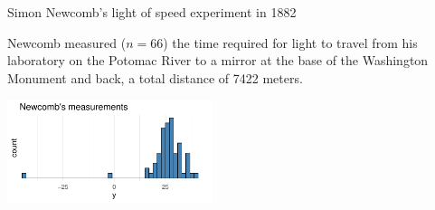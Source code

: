 \documentclass[10pt]{beamer}
\begin{document}
\begin{frame}{Simon Newcomb's light of speed experiment in 1882}

  {\small
  Newcomb measured ($n=66$) the time required for light to travel from
  his laboratory on the Potomac River to a mirror at the base of the
  Washington Monument and back, a total distance of 7422 meters.}
  \begin{center}
    \vspace{-0.5\baselineskip}
    {\includegraphics[width=6cm]{figs/newcomb_data.pdf}}\\
    \vspace{-1\baselineskip}
  \end{center}

\end{frame}
\end{document}
